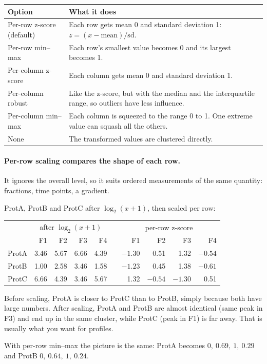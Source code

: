 \documentclass[11pt,a4paper]{article}
\begin{document}
\begin{center}
\begin{tabularx}{\textwidth}{lL}
\toprule
Option & What it does\\
\midrule
Per-row z-score (default) & Each row gets mean 0 and standard deviation 1: $z = (x-\text{mean})/\text{sd}$.\\
Per-row min--max & Each row's smallest value becomes 0 and its largest becomes 1.\\
Per-column z-score & Each column gets mean 0 and standard deviation 1.\\
Per-column robust & Like the z-score, but with the median and the interquartile range, so outliers have less
  influence.\\
Per-column min--max & Each column is squeezed to the range 0 to 1. One extreme value can squash all the others.\\
None & The transformed values are clustered directly.\\
\bottomrule
\end{tabularx}
\end{center}

\paragraph{Per-row scaling compares the shape of each row.}
It ignores the overall level, so it suits ordered measurements of the same quantity: fractions, time points, a
gradient.

\begin{example}
ProtA, ProtB and ProtC after $\log_2(x+1)$, then scaled per row:

\begin{center}
\begin{tabular}{l rrrr c rrrr}
\toprule
& \multicolumn{4}{c}{after $\log_2(x+1)$} && \multicolumn{4}{c}{per-row z-score}\\
\cmidrule{2-5}\cmidrule{7-10}
& F1 & F2 & F3 & F4 && F1 & F2 & F3 & F4\\
\midrule
ProtA & 3.46 & 5.67 & 6.66 & 4.39 && $-1.30$ & 0.51 & 1.32 & $-0.54$\\
ProtB & 1.00 & 2.58 & 3.46 & 1.58 && $-1.23$ & 0.45 & 1.38 & $-0.61$\\
ProtC & 6.66 & 4.39 & 3.46 & 5.67 && 1.32 & $-0.54$ & $-1.30$ & 0.51\\
\bottomrule
\end{tabular}
\end{center}

Before scaling, ProtA is closer to ProtC than to ProtB, simply because both have large numbers. After scaling,
ProtA and ProtB are almost identical (same peak in F3) and end up in the same cluster, while ProtC (peak in F1) is
far away. That is usually what you want for profiles.

With per-row min--max the picture is the same: ProtA becomes $0,\ 0.69,\ 1,\ 0.29$ and ProtB
$0,\ 0.64,\ 1,\ 0.24$.
\end{example}
\end{document}
